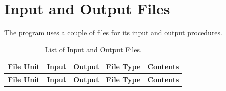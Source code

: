 \documentclass[a4paper,11pt]{report}
\begin{document}
\chapter{Input and Output Files} \label{Files}

The program uses a couple of files for its input and output procedures.

\begin{center}
\begin{longtable}{|c|c|c|c|c|}
  \caption{List of Input and Output Files.}\\
  \hline
  \rule[-5mm]{0mm}{12.5mm} {\bf File Unit} & {\bf Input} & {\bf Output} & {\bf File Type} & {\bf Contents} \\
  \hline
  \endfirsthead
  \hline
  \rule[-5mm]{0mm}{12.5mm} {\bf File Unit} & {\bf Input} & {\bf Output} & {\bf File Type} & {\bf Contents} \\
  \hline
  \endhead
  

\end{longtable}
\end{center}
\end{document}
